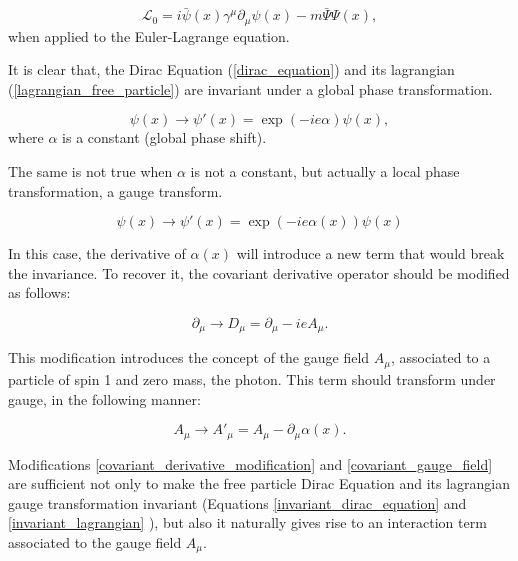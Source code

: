\begin{equation}
    \mathcal{L_{\text{0}}} = i\bar{\psi}(x)\gamma^\mu\partial_\mu\psi(x)-m\bar{\Psi}\Psi(x),
    \label{lagrangian_free_particle}
\end{equation}
when applied to the Euler-Lagrange equation.

It is clear that, the Dirac Equation (\ref{dirac_equation}) and its lagrangian (\ref{lagrangian_free_particle}) are invariant under a global phase transformation.

\begin{equation}
    \psi(x) \rightarrow \psi'(x) = \exp{(-ie\alpha)}\psi(x),
    \label{global_phase_transformation}
\end{equation}
where $\alpha$ is a constant (global phase shift).

The same is not true when $\alpha$ is not a constant, but actually a local phase transformation, a gauge transform.

\begin{equation}
    \psi(x) \rightarrow \psi'(x) = \exp{(-ie\alpha(x))}\psi(x)
    \label{local_phase_transformation}
\end{equation}

In this case, the derivative of $\alpha(x)$ will introduce a new term that would break the invariance. To recover it, the covariant derivative operator should be modified as follows:

\begin{equation}
    \partial_\mu \rightarrow D_\mu = \partial_\mu - ieA_\mu.
    \label{covariant_derivative_modification}
\end{equation}

This modification introduces the concept of the gauge field $A_\mu$, associated to a particle of spin 1 and zero mass, the photon. This term should transform under gauge, in the following manner:

\begin{equation}
    A_\mu \rightarrow A'_\mu = A_\mu - \partial_\mu\alpha(x).
    \label{covariant_gauge_field}
\end{equation}

Modifications \ref{covariant_derivative_modification} and \ref{covariant_gauge_field} are sufficient not only to make the free particle Dirac Equation and its lagrangian gauge transformation invariant (Equations \ref{invariant_dirac_equation} and \ref{invariant_lagrangian} ), but also it naturally gives rise to an interaction term associated to the gauge field $A_\mu$.

